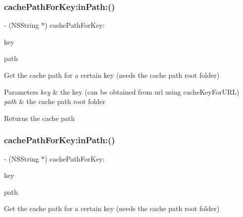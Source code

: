 \subsubsection{\texorpdfstring{cache\+Path\+For\+Key\+:in\+Path\+:()}{cachePathForKey:inPath:()}\hspace{0.1cm}{\footnotesize\ttfamily [2/3]}}
{\footnotesize\ttfamily -\/ (N\+S\+String $\ast$) cache\+Path\+For\+Key\+: \begin{DoxyParamCaption}\item[{(N\+S\+String $\ast$)}]{key }\item[{inPath:(N\+S\+String $\ast$)}]{path }\end{DoxyParamCaption}}

Get the cache path for a certain key (needs the cache path root folder)


\begin{DoxyParams}{Parameters}
{\em key} & the key (can be obtained from url using cache\+Key\+For\+U\+RL) \\
\hline
{\em path} & the cache path root folder\\
\hline
\end{DoxyParams}
\begin{DoxyReturn}{Returns}
the cache path 
\end{DoxyReturn}
\mbox{\label{interface_s_d_image_cache_a8dffa7933d6dcd6668331d03d29e2ad0}} 
\subsubsection{\texorpdfstring{cache\+Path\+For\+Key\+:in\+Path\+:()}{cachePathForKey:inPath:()}\hspace{0.1cm}{\footnotesize\ttfamily [3/3]}}
{\footnotesize\ttfamily -\/ (N\+S\+String $\ast$) cache\+Path\+For\+Key\+: \begin{DoxyParamCaption}\item[{(N\+S\+String $\ast$)}]{key }\item[{inPath:(N\+S\+String $\ast$)}]{path }\end{DoxyParamCaption}}

Get the cache path for a certain key (needs the cache path root folder)


